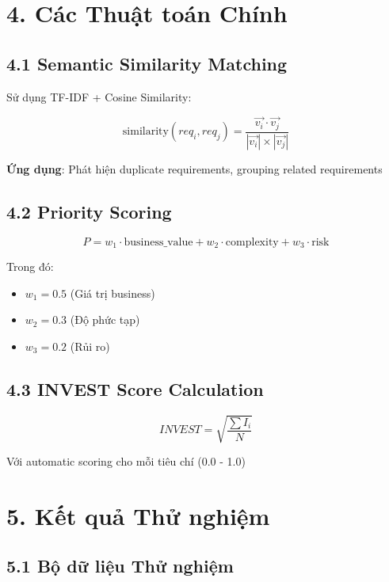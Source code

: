 \documentclass[12pt,a4paper]{article}
\begin{document}
\section{4. Các Thuật toán Chính}

\subsection{4.1 Semantic Similarity Matching}

Sử dụng TF-IDF + Cosine Similarity:

$$\text{similarity}(req_i, req_j) = \frac{\vec{v_i} \cdot \vec{v_j}}{|\vec{v_i}| \times |\vec{v_j}|}$$

\textbf{Ứng dụng}: Phát hiện duplicate requirements, grouping related requirements

\subsection{4.2 Priority Scoring}

$$P = w_1 \cdot \text{business\_value} + w_2 \cdot \text{complexity} + w_3 \cdot \text{risk}$$

Trong đó:
\begin{itemize}
    \item $w_1 = 0.5$ (Giá trị business)
    \item $w_2 = 0.3$ (Độ phức tạp)
    \item $w_3 = 0.2$ (Rủi ro)
\end{itemize}

\subsection{4.3 INVEST Score Calculation}

$$INVEST = \sqrt{\frac{\sum I_i}{N}}$$

Với automatic scoring cho mỗi tiêu chí (0.0 - 1.0)

\section{5. Kết quả Thử nghiệm}

\subsection{5.1 Bộ dữ liệu Thử nghiệm}
\end{document}
